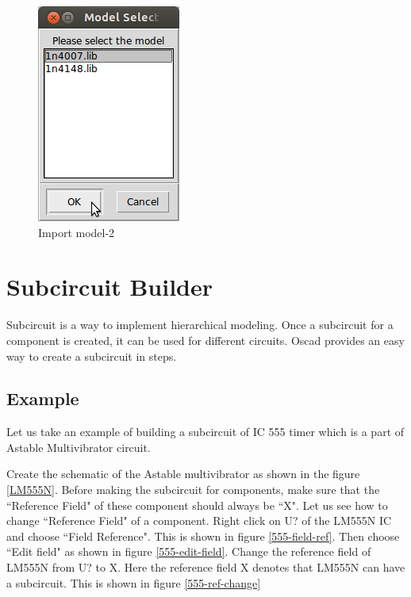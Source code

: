 \begin{figure}[t]%
\begin{center}
\includegraphics[width=.3\linewidth]{figures/import-mod.png}%
\caption{Import model-2}
\label{import-2}
\end{center}
\end{figure}


\section {Subcircuit Builder}
Subcircuit is a way to implement hierarchical modeling. Once a subcircuit for a component is created, it can be used for different circuits. Oscad provides an easy way to create a subcircuit in steps. 

\subsection{Example}

Let us take an example of building a subcircuit of IC 555 timer which is a part of Astable Multivibrator circuit.

Create the schematic of the Astable multivibrator as shown in the figure \ref{LM555N}. Before making the subcircuit for components, make sure that the ``Reference Field" of these component should always be ``X". Let us see how to change ``Reference Field"  of a component. Right click on U? of the LM555N IC and choose ``Field Reference". This is shown in figure \ref{555-field-ref}. Then choose ``Edit field" as shown in figure \ref{555-edit-field}. Change the reference field of LM555N from U? to X. Here the reference field X denotes that LM555N can have a subcircuit. This is shown in figure \ref{555-ref-change}

